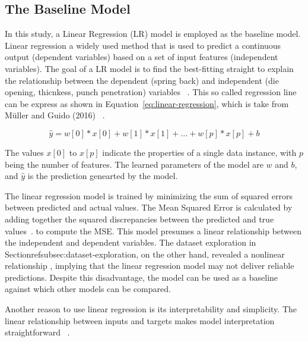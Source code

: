 \subsection{The Baseline Model}\label{subsec:regression-models}
In this study, a Linear Regression (LR) model is employed as the baseline model.
Linear regression a widely used method that is used to predict a continuous output (dependent variables) based on a set
of input features (independent variables).
The goal of a \ac{LR} model is to find the best-fitting straight to explain the relationship between the dependent
(spring back) and independent (die opening, thicnkess, punch penetration)
variables
~\cite[pp. 45--46]{muller_introductionmachinelearning_2016}.
This so called regression line can be express as shown in Equation~\ref{eq:linear-regression}, which is take from
Müller and Guido (2016)
~\cite[p. 45]{muller_introductionmachinelearning_2016}.

\begin{tcolorbox}[arc=0pt,boxrule=0.5pt]
    \begin{equation}
        \hat{y} = w[0] * x[0] + w[1] * x[1] + ... + w[p] * x[p] + b
        \label{eq:linear-regression}
    \end{equation}
\end{tcolorbox}

The values $x[0]$ to $x[p]$ indicate the properties of a single data instance, with $p$ being the number of
features.
The learned parameters of the model are $w$ and $b$, and $\hat{y}$  is the prediction genearted by the model.

The linear regression model is trained by minimizing the sum of squared errors between predicted and actual values.
The Mean Squared Error is calculated by adding together the squared discrepancies between the predicted and true
values~\cite[p. 47--68]{muller_introductionmachinelearning_2016}.
 to compute the MSE.
This model presumes a linear relationship between the independent and dependent variables.
The dataset exploration in Sectionrefsubsec:dataset-exploration, on the other hand, revealed a nonlinear relationship
, implying that the linear regression model may not deliver reliable predictions.
Despite this disadvantage, the model can be used as a baseline against which other models can be compared.

Another reason to use linear regression is its interpretability and simplicity.
The linear relationship between inputs and targets makes model interpretation
straightforward
~\cite[p. 37]{molnar2020interpretable}.

